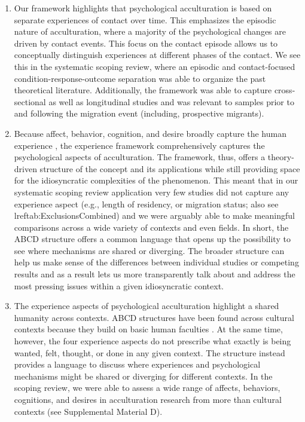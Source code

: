 \documentclass[man, 12pt, a4paper, mask]{apa7}
\newcommand{\sicontext}{Supplemental Material D}
\begin{document}
\begin{enumerate}
\item Our framework highlights that psychological acculturation is based on separate experiences of contact over time. This emphasizes the episodic nature of acculturation, where a majority of the psychological changes are driven by contact events. This focus on the contact episode allows us to conceptually distinguish experiences at different phases of the contact. We see this in the systematic scoping review, where an episodic and contact-focused condition-response-outcome separation was able to organize the past theoretical literature. Additionally, the framework was able to capture cross-sectional as well as longitudinal studies and was relevant to samples prior to and following the migration event (including, prospective migrants). 

\item Because affect, behavior, cognition, and desire broadly capture the human experience \citep[e.g.,][]{Jhangiani2014}, the experience framework comprehensively captures the psychological aspects of acculturation. The framework, thus, offers a theory-driven structure of the concept and its applications while still providing space for the idiosyncratic complexities of the phenomenon. This meant that in our systematic scoping review application very few studies did not capture any experience aspect (e.g., length of residency, or migration status; also see lref{tab:ExclusionsCombined}) and we were arguably able to make meaningful comparisons across a wide variety of contexts and even fields. In short, the ABCD structure offers a common language that opens up the possibility to see where mechanisms are shared or diverging. The broader structure can help us make sense of the differences between individual studies or competing results and as a result lets us more transparently talk about and address the most pressing issues within a given idiosyncratic context.

\item The experience aspects of psychological acculturation highlight a shared humanity across contexts. ABCD structures have been found across cultural contexts because they build on basic human faculties \citep[e.g.,][]{Bhawuk2011}. At the same time, however, the four experience aspects do not prescribe what exactly is being wanted, felt, thought, or done in any given context. The structure instead provides a language to discuss where experiences and psychological mechanisms might be shared or diverging for different contexts. In the scoping review, we were able to assess a wide range of affects, behaviors, cognitions, and desires in acculturation research from more than \nCultureCombs cultural contexts (see \sicontext).


\end{enumerate}
\end{document}
